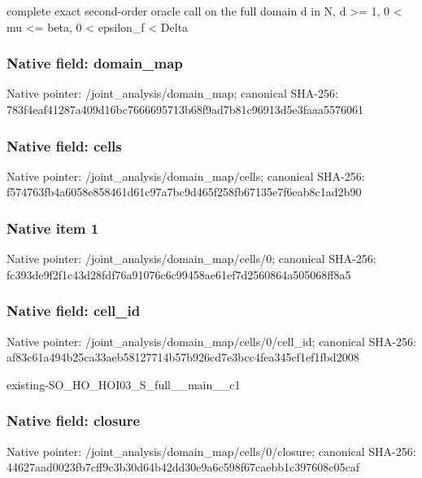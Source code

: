 \documentclass[10pt,a4paper]{article}
\begin{document}
\begingroup\raggedright{} complete exact second-order oracle call on the full domain d in N,\allowbreak{} d >=\allowbreak{} 1,\allowbreak{} 0 < mu <=\allowbreak{} beta,\allowbreak{} 0 < epsilon\_\allowbreak{}f < Delta\par\endgroup

\subsubsection{Native field: domain\_\allowbreak{}map}
Native pointer: /joint\_\allowbreak{}analysis/domain\_\allowbreak{}map; canonical SHA-256: 783f4eaf41287a409d16bc7666695713b68f9ad7b81c96913d5e3faaa5576061

\subsubsection{Native field: cells}
Native pointer: /joint\_\allowbreak{}analysis/domain\_\allowbreak{}map/cells; canonical SHA-256: f574763fb4a6058e858461d61c97a7bc9d465f258fb67135e7f6eab8c1ad2b90

\subsubsection{Native item 1}
Native pointer: /joint\_\allowbreak{}analysis/domain\_\allowbreak{}map/cells/0; canonical SHA-256: fc393de9f2f1c43d28fdf76a91076c6c99458ae61ef7d2560864a505068ff8a5

\subsubsection{Native field: cell\_\allowbreak{}id}
Native pointer: /joint\_\allowbreak{}analysis/domain\_\allowbreak{}map/cells/0/cell\_\allowbreak{}id; canonical SHA-256: af83c61a494b25ca33aeb58127714b57b926cd7e3bcc4fea345cf1ef1fbd2008

\begingroup\raggedright\sloppy existing-SO\_\allowbreak{}HO\_\allowbreak{}HOI03\_\allowbreak{}S\_\allowbreak{}full\_\allowbreak{}\_\allowbreak{}main\_\allowbreak{}\_\allowbreak{}c1\par\endgroup

\subsubsection{Native field: closure}
Native pointer: /joint\_\allowbreak{}analysis/domain\_\allowbreak{}map/cells/0/closure; canonical SHA-256: 44627aad0023fb7cff9c3b30d64b42dd30e9a6c598f67caebb1c397608c05caf
\end{document}
